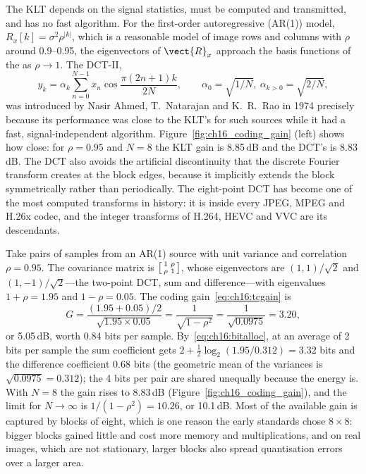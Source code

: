 The KLT depends on the signal statistics, must be computed and transmitted, and has no fast
algorithm. For the first-order autoregressive (AR(1)) model, $R_x[k]=\sigma^2\rho^{|k|}$, which is a
reasonable model of image rows and columns with $\rho$ around 0.9--0.95, the eigenvectors of
$\vect{R}_x$ approach the basis functions of the  as $\rho\to1$. The
DCT-II,
\begin{equation}
y_k=\alpha_k\sum_{n=0}^{N-1}x_n\cos\frac{\pi(2n+1)k}{2N},\qquad
\alpha_0=\sqrt{1/N},\ \alpha_{k>0}=\sqrt{2/N},
\label{eq:ch16:dct}
\end{equation}
was introduced by Nasir Ahmed, T.~Natarajan and K.~R.~Rao in 1974 precisely because its
performance was close to the KLT's for such sources while it had a fast, signal-independent
algorithm. Figure~\ref{fig:ch16_coding_gain} (left) shows how close: for $\rho=0.95$ and $N=8$
the KLT gain is 8.85\,dB and the DCT's is 8.83\,dB. The DCT also avoids the artificial
discontinuity that the discrete Fourier transform creates at the block edges, because it
implicitly extends the block symmetrically rather than periodically. The eight-point DCT has
become one of the most computed transforms in history: it is inside every JPEG, MPEG and H.26x
codec, and the integer transforms of H.264, HEVC and VVC are its descendants.

\begin{worked}
Take pairs of samples from an AR(1) source with unit variance and correlation $\rho=0.95$. The
covariance matrix is $\begin{bsmallmatrix}1&\rho\\ \rho&1\end{bsmallmatrix}$, whose eigenvectors are
$(1,1)/\sqrt2$ and $(1,-1)/\sqrt2$---the two-point DCT, sum and difference---with eigenvalues
$1+\rho=1.95$ and $1-\rho=0.05$. The coding gain~\eqref{eq:ch16:tcgain} is
\[
G=\frac{(1.95+0.05)/2}{\sqrt{1.95\times0.05}}=\frac{1}{\sqrt{1-\rho^2}}=\frac{1}{\sqrt{0.0975}}=3.20,
\]
or 5.05\,dB, worth 0.84 bits per sample. By~\eqref{eq:ch16:bitalloc}, at an average of 2 bits per
sample the sum coefficient gets $2+\frac12\log_2(1.95/0.312)=3.32$ bits and the difference
coefficient $0.68$ bits (the geometric mean of the variances is $\sqrt{0.0975}=0.312$); the 4 bits
per pair are shared unequally because the energy is. With $N=8$ the gain rises to 8.83\,dB
(Figure~\ref{fig:ch16_coding_gain}), and the limit for $N\to\infty$ is $1/(1-\rho^2)=10.26$, or
10.1\,dB. Most of the available gain is captured by blocks of eight, which is one reason the early
standards chose $8\times8$: bigger blocks gained little and cost more memory and multiplications, and
on real images, which are not stationary, larger blocks also spread quantisation errors over a
larger area.
\end{worked}

